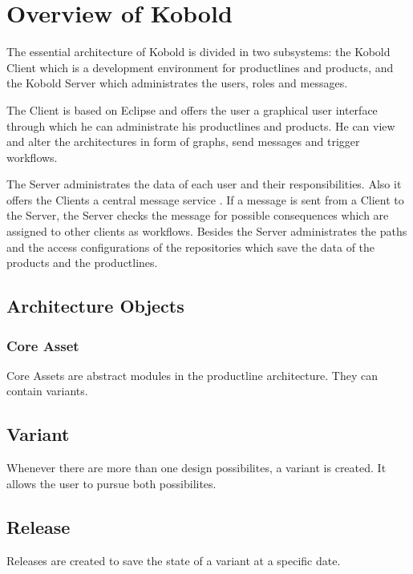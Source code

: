\chapter{Overview of Kobold}

The essential architecture of Kobold is divided in two subsystems: the Kobold Client
which is a development environment for productlines and products, and the Kobold 
Server which administrates the users, roles and messages. \par

The Client is based on Eclipse and offers the user a graphical user interface
through which he can administrate his productlines and products. He can view and alter the
architectures in form of graphs, send messages and trigger workflows.\par

The Server administrates the data of each user and their responsibilities. Also it
offers the Clients a central message service . If a message is sent from a Client
to the Server, the Server checks the message for possible consequences which are
assigned to other clients as workflows. Besides the Server administrates the paths
and the access configurations of the repositories which save the data of the products
and the productlines.

\section{Architecture Objects}

\subsection{Core Asset}

Core Assets are abstract modules in the productline architecture. They can contain variants.

\section{Variant}

Whenever there are more than one design possibilites, a variant is created. It allows
the user to pursue both possibilites.

\section{Release}

Releases are created to save the state of a variant at a specific date. 

